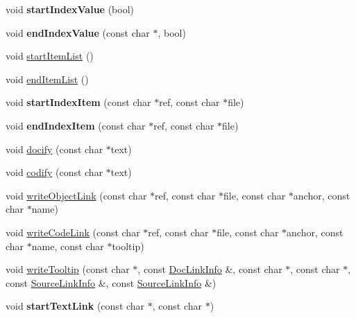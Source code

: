 \begin{DoxyCompactItemize}
void {\bfseries start\+Index\+Value} (bool)
\item 
\mbox{\label{class_man_generator_a6ad3a6b5074c75aa9dbe2e48a88d575d}} 
void {\bfseries end\+Index\+Value} (const char $\ast$, bool)
\item 
void \mbox{\hyperlink{class_man_generator_a5b29aa8c2dd69237fd7470df129fc4e3}{start\+Item\+List}} ()
\item 
void \mbox{\hyperlink{class_man_generator_abb7aa578a49c62b103f85e0f5d3c9e2a}{end\+Item\+List}} ()
\item 
\mbox{\label{class_man_generator_a51cec6b9dc4026bfb5369b9f2285e76f}} 
void {\bfseries start\+Index\+Item} (const char $\ast$ref, const char $\ast$file)
\item 
\mbox{\label{class_man_generator_a5902ca975ce0716970c7de209d5be303}} 
void {\bfseries end\+Index\+Item} (const char $\ast$ref, const char $\ast$file)
\item 
void \mbox{\hyperlink{class_man_generator_aae62a687e228c0f3c5b698570c603022}{docify}} (const char $\ast$text)
\item 
void \mbox{\hyperlink{class_man_generator_a6e70bf6444a4e6d5db43f5bbb7b6b125}{codify}} (const char $\ast$text)
\item 
void \mbox{\hyperlink{class_man_generator_a4bcf9c17c915914aca7b271c85aa08ea}{write\+Object\+Link}} (const char $\ast$ref, const char $\ast$file, const char $\ast$anchor, const char $\ast$name)
\item 
void \mbox{\hyperlink{class_man_generator_ac4d91e5763d584238139d65d873e9f64}{write\+Code\+Link}} (const char $\ast$ref, const char $\ast$file, const char $\ast$anchor, const char $\ast$name, const char $\ast$tooltip)
\item 
void \mbox{\hyperlink{class_man_generator_a8ec440b278091bf61579f35cd8237a25}{write\+Tooltip}} (const char $\ast$, const \mbox{\hyperlink{struct_doc_link_info}{Doc\+Link\+Info}} \&, const char $\ast$, const char $\ast$, const \mbox{\hyperlink{struct_source_link_info}{Source\+Link\+Info}} \&, const \mbox{\hyperlink{struct_source_link_info}{Source\+Link\+Info}} \&)
\item 
\mbox{\label{class_man_generator_a3c1d7362119d49471f88a39189e63869}} 
void {\bfseries start\+Text\+Link} (const char $\ast$, const char $\ast$)
\item 

\end{DoxyCompactItemize}
